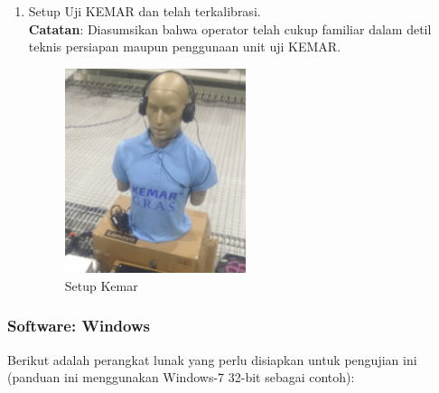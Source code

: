 \documentclass[12pt,]{article}
\begin{document}
\begin{enumerate}
		\newpage
		\item Setup Uji KEMAR dan telah terkalibrasi.\\
		\textbf{Catatan}: Diasumsikan bahwa operator telah cukup familiar dalam detil teknis persiapan 
		maupun penggunaan unit uji KEMAR.
		\begin{figure}[!ht]
			\centering
			\includegraphics[width=150pt]{images/foto/kemar}
			\caption{Setup Kemar}
		\end{figure}
		
	\end{enumerate}

	\subsubsection{Software: Windows}
	
	Berikut adalah perangkat lunak yang perlu disiapkan untuk pengujian ini
	(panduan ini menggunakan Windows-7 32-bit sebagai contoh):
	
\end{document}
